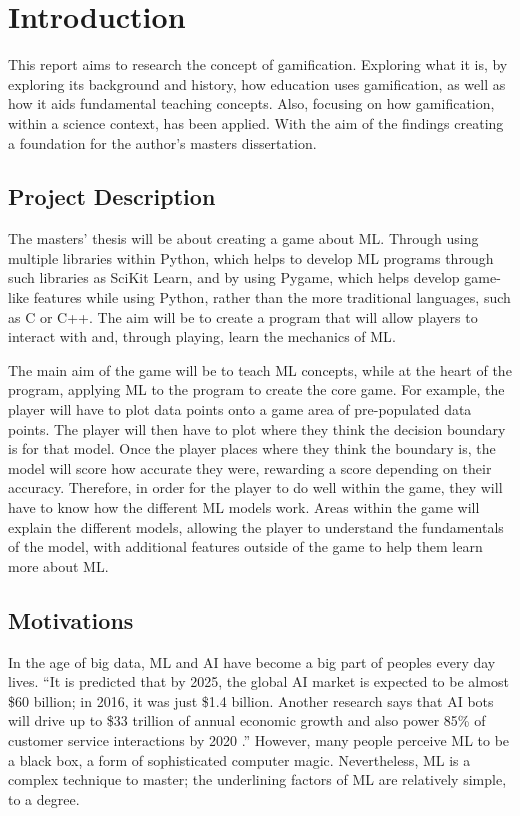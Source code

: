 \chapter{Introduction}
	\label{chap:intro}
	
	This report aims to research the concept of gamification. Exploring what it is, by exploring its background and history, how education uses gamification, as well as how it aids fundamental teaching concepts. Also, focusing on how gamification, within a science context, has been applied. With the aim of the findings creating a foundation for the author’s masters dissertation.
	
	
	\section{Project Description}
		\label{sec:intro_pro_desc} 	
		
		
		The masters' thesis will be about creating a game about \ac{ML}. Through using multiple libraries within Python, which helps to develop \ac{ML} programs through such libraries as SciKit Learn, and by using Pygame, which helps develop game-like features while using Python, rather than the more traditional languages, such as C or C++. The aim will be to create a program that will allow players to interact with and, through playing, learn the mechanics of \ac{ML}. 
		
		The main aim of the game will be to teach \ac{ML} concepts, while at the heart of the program, applying \ac{ML} to the program to create the core game. For example, the player will have to plot data points onto a game area of pre-populated data points. The player will then have to plot where they think the decision boundary is for that model. Once the player places where they think the boundary is, the model will score how accurate they were, rewarding a score depending on their accuracy. Therefore, in order for the player to do well within the game, they will have to know how the different \ac{ML} models work. Areas within the game will explain the different models, allowing the player to understand the fundamentals of the model, with additional features outside of the game to help them learn more about \ac{ML}.
		
	\section{Motivations}
		\label{sec:intro_motivation} 
		
		In the age of big data, \ac{ML} and \ac{AI} have become a big part of peoples every day lives. “It is predicted that by 2025, the global \ac{AI} market is expected to be almost \$60 billion; in 2016, it was just \$1.4 billion. Another research says that \ac{AI} bots will drive up to \$33 trillion of annual economic growth and also power 85\% of customer service interactions by 2020 \cite{hackernoon}.” However, many people perceive \ac{ML} to be a black box, a form of sophisticated computer magic. Nevertheless, \ac{ML} is a complex technique to master; the underlining factors of \ac{ML} are relatively simple, to a degree.
		
